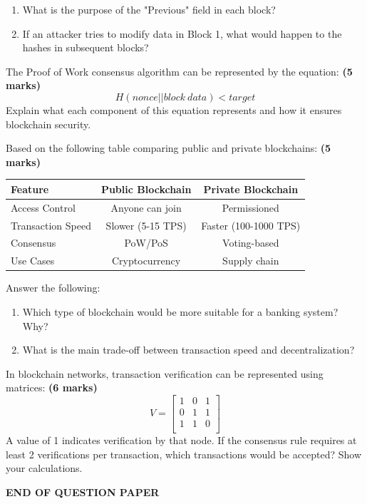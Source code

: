 \documentclass[11pt,a4paper]{exam}
\begin{document}
\begin{questions}
\begin{enumerate}
\item What is the purpose of the "Previous" field in each block?
\item If an attacker tries to modify data in Block 1, what would happen to the hashes in subsequent blocks?
\end{enumerate}

\question[5] The Proof of Work consensus algorithm can be represented by the equation: \hfill \textbf{(5 marks)}
\[
H(nonce || block\ data) < target
\]
Explain what each component of this equation represents and how it ensures blockchain security.

\question[5] Based on the following table comparing public and private blockchains: \hfill \textbf{(5 marks)}

\begin{center}
\begin{tabular}{|l|c|c|}
\hline
\textbf{Feature} & \textbf{Public Blockchain} & \textbf{Private Blockchain} \\
\hline
Access Control & Anyone can join & Permissioned \\
\hline
Transaction Speed & Slower (5-15 TPS) & Faster (100-1000 TPS) \\
\hline
Consensus & PoW/PoS & Voting-based \\
\hline
Use Cases & Cryptocurrency & Supply chain \\
\hline
\end{tabular}
\end{center}

Answer the following:
\begin{enumerate}
\item Which type of blockchain would be more suitable for a banking system? Why?
\item What is the main trade-off between transaction speed and decentralization?
\end{enumerate}

\question[6] In blockchain networks, transaction verification can be represented using matrices: \hfill \textbf{(6 marks)}
\[
V = \begin{bmatrix}
1 & 0 & 1 \\
0 & 1 & 1 \\
1 & 1 & 0 \\
\end{bmatrix}
\]
A value of 1 indicates verification by that node. If the consensus rule requires at least 2 verifications per transaction, which transactions would be accepted? Show your calculations.

\end{questions}

\vspace{0.5cm}
\begin{center}
\textbf{END OF QUESTION PAPER}
\end{center}
\end{document}
